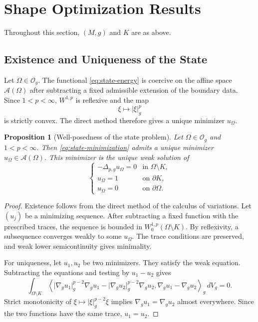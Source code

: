 \documentclass[11pt,a4paper]{article}
\newtheorem{proposition}[theorem]{Proposition}
\theoremstyle{definition}
\theoremstyle{remark}
\newcommand{\Og}{\mathcal{O}_g}
\newcommand{\gradg}{\nabla_g}
\newcommand{\plapg}{\Delta_{p,g}}
\newcommand{\normg}[1]{\lvert #1\rvert_g}
\begin{document}
\section{Shape Optimization Results}

Throughout this section, $(M,g)$ and $K$ are as above.

\subsection{Existence and Uniqueness of the State}

Let $\Omega\in\Og$. The functional \eqref{eq:state-energy} is
coercive on the affine space $\mathcal{A}(\Omega)$ after subtracting
a fixed admissible extension of the boundary data. Since
$1<p<\infty$, $W^{1,p}$ is reflexive and the map
\[
\xi\longmapsto\normg{\xi}^{p}
\]
is strictly convex. The direct method therefore gives a unique
minimizer $u_\Omega$.

\begin{proposition}[Well-posedness of the state problem]
\label{prop:state-wellposed}
Let $\Omega\in\Og$ and $1<p<\infty$. Then
\eqref{eq:state-minimization} admits a unique minimizer
$u_\Omega\in\mathcal{A}(\Omega)$. This minimizer is the unique weak
solution of
\[
\begin{cases}
-\plapg u_\Omega=0
&\text{in }\Omega\setminus K,\\
u_\Omega=1
&\text{on }\partial K,\\
u_\Omega=0
&\text{on }\partial\Omega.
\end{cases}
\]
\end{proposition}

\begin{proof}
Existence follows from the direct method of the calculus of
variations. Let $(u_j)$ be a minimizing sequence. After subtracting
a fixed function with the prescribed traces, the sequence is bounded
in $W^{1,p}_0(\Omega\setminus K)$. By reflexivity, a subsequence
converges weakly to some $u_\Omega$. The trace conditions are
preserved, and weak lower semicontinuity gives minimality.

For uniqueness, let $u_1,u_2$ be two minimizers. They satisfy the
weak equation. Subtracting the equations and testing by
$u_1-u_2$ gives
\[
\int_{\Omega\setminus K}
\left\langle
\normg{\gradg u_1}^{p-2}\gradg u_1
-
\normg{\gradg u_2}^{p-2}\gradg u_2,
\gradg u_1-\gradg u_2
\right\rangle_g
\,dV_g=0.
\]
Strict monotonicity of
$\xi\mapsto\normg{\xi}^{p-2}\xi$ implies
$\gradg u_1=\gradg u_2$ almost everywhere. Since the two functions
have the same trace, $u_1=u_2$.
\end{proof}
\end{document}
